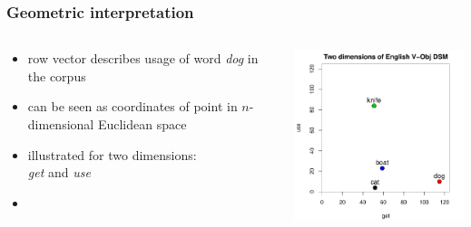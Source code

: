 \begin{frame}
  \frametitle{Geometric interpretation}

  \begin{columns}[T]
    \begin{column}{40mm}
      \begin{itemize}
      \item row vector  describes usage of word \emph{dog} in the corpus
      \item can be seen as coordinates of point in $n$-dimensional Euclidean space
      \item illustrated for two dimensions:\\ \emph{get} and \emph{use}
      \item {}
      \end{itemize}
    \end{column}
    \begin{column}{75mm}      
      \ungap[1]
      \includegraphics[width=75mm]{img/hieroglyph_2d_1}
    \end{column}
  \end{columns}
\end{frame}

